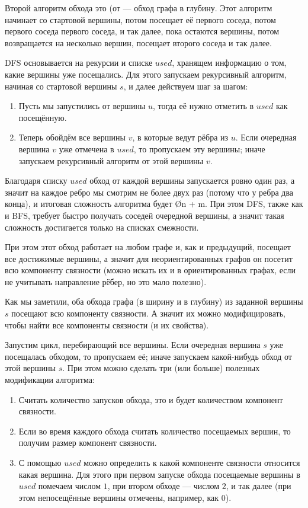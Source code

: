 Второй алгоритм обхода это  (от  — обход графа в глубину. Этот алгоритм начинает со стартовой вершины, потом посещает её первого соседа, потом первого соседа первого соседа, и так далее, пока остаются вершины, потом возвращается на несколько вершин, посещает второго соседа и так далее.

DFS основывается на рекурсии и списке $used$, хранящем информацию о том, какие вершины уже посещались. Для этого запускаем рекурсивный алгоритм, начиная со стартовой вершины $s$, и далее действуем шаг за шагом:

\begin{box-algo}
    \begin{enumerate}
        \item Пусть мы запустились от вершины $u$, тогда её нужно отметить в $used$ как посещённую.
        \item Теперь обойдём все вершины $v$, в которые ведут рёбра из $u$. Если очередная вершина $v$ уже отмечена в $used$, то пропускаем эту вершины; иначе запускаем рекурсивный алгоритм от этой вершины $v$.
    \end{enumerate}
\end{box-algo}

Благодаря списку $used$ обход от каждой вершины запускается ровно один раз, а значит на каждое ребро мы смотрим не более двух раз (потому что у ребра два конца), и итоговая сложность алгоритма будет \O{n + m}. При этом DFS, также как и BFS, требует быстро получать соседей очередной вершины, а значит такая сложность достигается только на списках смежности.

При этом этот обход работает на любом графе и, как и предыдущий, посещает все достижимые вершины, а значит для неориентированных графов он посетит всю компоненту связности (можно искать их и в ориентированных графах, если не учитывать направление рёбер, но это мало полезно).


Как мы заметили, оба обхода графа (в ширину и в глубину) из заданной вершины $s$ посещают всю компоненту связности. А значит их можно модифицировать, чтобы найти все компоненты связности (и их свойства).

Запустим цикл, перебирающий все вершины. Если очередная вершина $s$ уже посещалась обходом, то пропускаем её; иначе запускаем какой-нибудь обход от этой вершины $s$. При этом можно сделать три (или больше) полезных модификации алгоритма:

\begin{enumerate}
    \item Считать количество запусков обхода, это и будет количеством компонент связности.
    \item Если во время каждого обхода считать количество посещаемых вершин, то получим размер компонент связности.
    \item С помощью $used$ можно определить к какой компоненте связности относится какая вершина. Для этого при первом запуске обхода посещаемые вершины в $used$ помечаем числом $1$, при втором обходе — числом $2$, и так далее (при этом непосещённые вершины отмечены, например, как $0$).
\end{enumerate}


